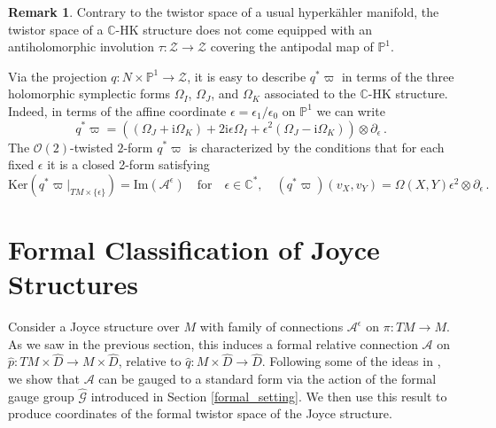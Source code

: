 \documentclass{article}
\theoremstyle{definition}
\newtheorem{remark}[theorem]{Remark}
\numberwithin{equation}{section}
\begin{document}
\begin{remark}
    Contrary to the twistor space of a usual hyperk\"{a}hler manifold, the twistor space of a $\mathbb{C}$-HK structure does not come equipped with an antiholomorphic involution $\tau:\mathcal{Z}\to \mathcal{Z}$ covering the antipodal map of $\mathbb{P}^1$.
\end{remark}

Via the projection $q:N\times \mathbb{P}^1\to \mathcal{Z}$, it is easy to describe $q^*\varpi$ in terms of the three holomorphic symplectic forms $\Omega_I$, $\Omega_J$, and $\Omega_K$ associated to the $\mathbb{C}$-HK structure. Indeed, in terms of the affine coordinate $\epsilon = \epsilon_1/\epsilon_0$ on $\mathbb{P}^1$ we can write
\begin{equation}\label{twistholsymp}
    q^*\varpi=\left((\Omega_J+\mathrm{i}\Omega_K)+2\mathrm{i}\epsilon\Omega_I+\epsilon^2(\Omega_J-\mathrm{i}\Omega_K)\right)\otimes \partial_{\epsilon}\,.
\end{equation}
The $\mathcal{O}(2)$-twisted $2$-form $q^*\varpi$ is characterized by the conditions that for each fixed $\epsilon$ it is a closed 2-form satisfying 
\begin{equation*}
    \text{Ker}(q^*\varpi|_{TM\times \{\epsilon\}})=\text{Im}(\mathcal{A}^{\epsilon}) \quad \text{for} \quad \epsilon \in \mathbb{C}^{*}, \quad (q^*\varpi)(v_X,v_Y)=\Omega(X,Y)\epsilon^2\otimes \partial_{\epsilon}\,.
\end{equation*}





\section{Formal Classification of Joyce Structures}\label{sec3}

Consider a Joyce structure over $M$ with family of connections $\mathcal{A}^{\epsilon}$ on $\pi:TM \to M$. As we saw in the previous section, this induces a formal relative connection $\mathcal{A}$ on $\widehat{p}:TM \times \widehat{D}\to M\times \widehat{D}$, relative to $\widehat{q}:M\times \widehat{D}\to \widehat{D}$. Following some of the ideas in \cite[Section 5.3]{KSresurgence}, we show that $\mathcal{A}$ can be gauged to a standard form via the action of the formal gauge group  $\widehat{\mathcal{G}}$ introduced in Section \ref{formal_setting}. We then use this result to produce coordinates of the formal twistor space of the Joyce structure.   \\
\end{document}
